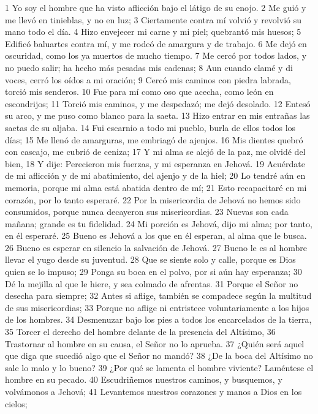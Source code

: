 1 Yo soy el hombre que ha visto aflicción bajo el látigo de su enojo.
2 Me guió y me llevó en tinieblas, y no en luz;
3 Ciertamente contra mí volvió y revolvió su mano todo el día.
4 Hizo envejecer mi carne y mi piel; quebrantó mis huesos;
5 Edificó baluartes contra mí, y me rodeó de amargura y de trabajo.
6 Me dejó en oscuridad, como los ya muertos de mucho tiempo.
7 Me cercó por todos lados, y no puedo salir; ha hecho más pesadas mis cadenas;
8 Aun cuando clamé y di voces, cerró los oídos a mi oración;
9 Cercó mis caminos con piedra labrada, torció mis senderos.
10 Fue para mí como oso que acecha, como león en escondrijos;
11 Torció mis caminos, y me despedazó; me dejó desolado.
12 Entesó su arco, y me puso como blanco para la saeta.
13 Hizo entrar en mis entrañas las saetas de su aljaba.
14 Fui escarnio a todo mi pueblo, burla de ellos todos los días;
15 Me llenó de amarguras, me embriagó de ajenjos.
16 Mis dientes quebró con cascajo, me cubrió de ceniza;
17 Y mi alma se alejó de la paz, me olvidé del bien,
18 Y dije: Perecieron mis fuerzas, y mi esperanza en Jehová.
19 Acuérdate de mi aflicción y de mi abatimiento, del ajenjo y de la hiel;
20 Lo tendré aún en memoria, porque mi alma está abatida dentro de mí;
21 Esto recapacitaré en mi corazón, por lo tanto esperaré.
22 Por la misericordia de Jehová no hemos sido consumidos, porque nunca decayeron sus misericordias. 
23 Nuevas son cada mañana; grande es tu fidelidad.
24 Mi porción es Jehová, dijo mi alma; por tanto, en él esperaré.
25 Bueno es Jehová a los que en él esperan, al alma que le busca.
26 Bueno es esperar en silencio la salvación de Jehová.
27 Bueno le es al hombre llevar el yugo desde su juventud.
28 Que se siente solo y calle, porque es Dios quien se lo impuso;
29 Ponga su boca en el polvo, por si aún hay esperanza;
30 Dé la mejilla al que le hiere, y sea colmado de afrentas.
31 Porque el Señor no desecha para siempre;
32 Antes si aflige, también se compadece según la multitud de sus misericordias;
33 Porque no aflige ni entristece voluntariamente a los hijos de los hombres.
34 Desmenuzar bajo los pies a todos los encarcelados de la tierra,
35 Torcer el derecho del hombre delante de la presencia del Altísimo,
36 Trastornar al hombre en su causa, el Señor no lo aprueba.
37 ¿Quién será aquel que diga que sucedió algo que el Señor no mandó?
38 ¿De la boca del Altísimo no sale lo malo y lo bueno?
39 ¿Por qué se lamenta el hombre viviente? Laméntese el hombre en su pecado.
40 Escudriñemos nuestros caminos, y busquemos, y volvámonos a Jehová;
41 Levantemos nuestros corazones y manos a Dios en los cielos;
